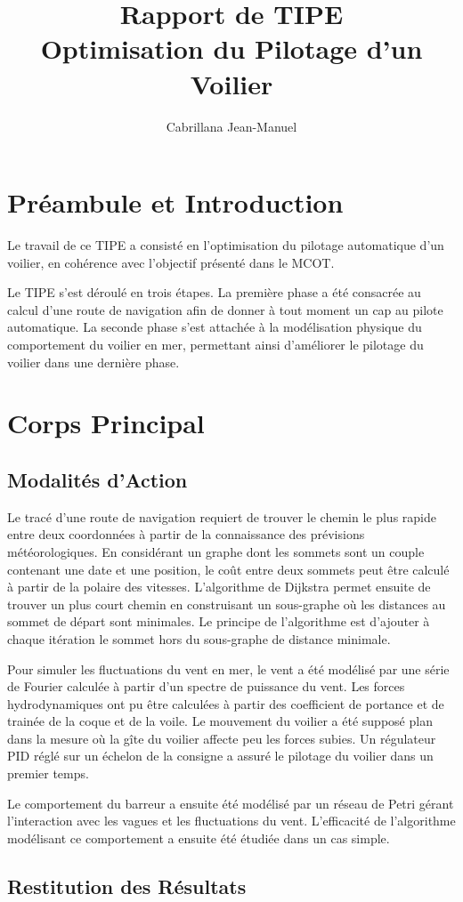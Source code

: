 \documentclass[12pt,a4paper]{article}
\title{Rapport de TIPE \\
Optimisation du Pilotage d'un Voilier}
\author{Cabrillana Jean-Manuel}
\begin{document}
\maketitle

\section{Préambule et Introduction}

  Le travail de ce TIPE a consisté en l'optimisation du pilotage automatique d'un voilier, en cohérence avec l'objectif présenté dans le MCOT.
  
  Le TIPE s'est déroulé en trois étapes. La première phase a été consacrée au calcul d'une route de navigation afin de donner à tout moment un cap au pilote automatique. La seconde phase s'est attachée à la modélisation physique du comportement du voilier en mer, permettant ainsi d'améliorer le pilotage du voilier dans une dernière phase.
  

\section{Corps Principal}

\subsection{Modalités d'Action}

	Le tracé d'une route de navigation requiert de trouver le chemin le plus rapide entre deux coordonnées à partir de la connaissance des prévisions météorologiques. En considérant un graphe dont les sommets sont un couple contenant une date et une position, le coût entre deux sommets peut être calculé à partir de la polaire des vitesses. L'algorithme de Dijkstra permet ensuite de trouver un plus court chemin en construisant un sous-graphe où les distances au sommet de départ sont minimales. Le principe de l'algorithme est d'ajouter à chaque itération le sommet hors du sous-graphe de distance minimale.
	
	Pour simuler les fluctuations du vent en mer, le vent a été modélisé par une série de Fourier calculée à partir d'un spectre de puissance du vent. Les forces hydrodynamiques ont pu être calculées à partir des coefficient de portance et de trainée de la coque et de la voile. Le mouvement du voilier a été supposé plan dans la mesure où la gîte du voilier affecte peu les forces subies. Un régulateur PID réglé sur un échelon de la consigne a assuré le pilotage du voilier dans un premier temps.

	Le comportement du barreur a ensuite été modélisé par un réseau de Petri gérant l'interaction avec les vagues et les fluctuations du vent. L'efficacité de l'algorithme modélisant ce comportement a ensuite été étudiée dans un cas simple.
	
\subsection{Restitution des Résultats}
\end{document}
